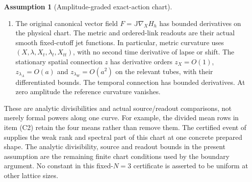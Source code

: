 \documentclass[11pt]{article}
\numberwithin{equation}{section}
\theoremstyle{definition}
\newtheorem{assumption}[assumption]{Assumption}
\theoremstyle{remark}
\begin{document}
\begin{assumption}[Amplitude-graded exact-action chart]
\begin{enumerate}[label=\textup{(C\arabic*)},leftmargin=3em]
\begin{equation}
\begin{aligned}
 |R_s|&\le C(a^4+a^2|v|+a|v|^2),&
 |D_vR_s|&\le C(a^2+a|v|),\\
 |R_f|&\le C(a^4+a|v|+|v|^2),&
 |D_vR_f|&\le C(a+|v|).
 \end{aligned}
 \label{eq:supp-exact-graded-remainders}
\end{equation}
The transport identity is $C_{\rm red}b_s+Bb_w=0$.
For $D=\operatorname{diag}(0_{294},B)$ there are commuting projections
$\Pi_++\Pi_-=I$ and constants $M_D,\kappa>0$ such that
\begin{equation}
 \|e^{sD}\Pi_-\|\le M_D,\qquad
 \|e^{-sD}\Pi_+\|\le M_De^{-\kappa s}\quad(s\ge0).
 \label{eq:supp-exact-dichotomy}
\end{equation}
No rank is prescribed in the boundary argument.  At the certified event of
, the weak block $B$ is the generator
$B_W$ of \eqref{eq:supp-certified-8813}, $\Pi_+$ is the eight-dimensional
unstable projector and $\Pi_-$ contains the stable and bounded-centre
subspaces.
\item The original canonical vector field $F=\mathbb J\nabla_XH_h$ has
bounded derivatives on the physical chart. The metric and ordered-link
readouts are their actual smooth fixed-cutoff jet functions. In particular,
metric curvature uses $(X,\lambda,X_t,\lambda_t,X_{tt})$, with no second
time derivative of lapse or shift. The stationary spatial connection $z$
has derivative orders $z_X=O(1)$, $z_{\lambda_A}=O(a)$ and
$z_{\lambda_W}=O(a^2)$ on the relevant tubes, with their differentiated
bounds. The temporal connection has bounded derivatives. At zero amplitude
the reference curvature vanishes.
\end{enumerate}
\end{assumption}

These are analytic divisibilities and actual source/readout comparisons,
not merely formal powers along one curve. For example, the divided mean
rows in item \textup{(C2)} retain the four means rather than remove them.
The certified event of 
supplies the weak rank and spectral part of this chart at one concrete
prepared shape.  The analytic divisibility, source and readout bounds in the
present assumption are the remaining finite chart conditions used by the
boundary argument.  No constant in this fixed-$N=3$ certificate is asserted
to be uniform at other lattice sizes.
\end{document}
